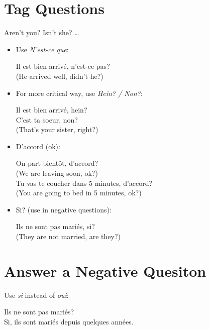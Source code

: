 \documentclass{book}
\begin{document}
    \section{Tag Questions}
        Aren't you? Isn't she? \dots
        \begin{itemize}
            \item Use \textit{N'est-ce que}:
                \begin{center}
                    Il est bien arrivé, n'est-ce pas? \\
                    (He arrived well, didn't he?)
                \end{center}

            \item For more critical way, use \textit{Hein? / Non?}:
                \begin{center}
                    Il est bien arrivé, hein? \\
                    C'est ta soeur, non? \\
                    (That's your sister, right?)
                \end{center}
            
            \item D'accord (ok):
                \begin{center}
                    On part bientôt, d'accord? \\
                    (We are leaving soon, ok?) \\
                    Tu vas te coucher dans 5 minutes, d'accord? \\
                    (You are going to bed in 5 minutes, ok?)
                \end{center}

            \item Si? (use in negative questions):
                \begin{center}
                    Ils ne sont pas mariés, si? \\
                    (They are not married, are they?)
                \end{center}
        \end{itemize}

    \section{Answer a Negative Quesiton}
        Use \textit{si} instead of \textit{oui}:
            \begin{center}
                Ils ne sont pas mariés? \\
                Si, ils sont mariés depuis quelques années. 
            \end{center}   
            
\end{document}
